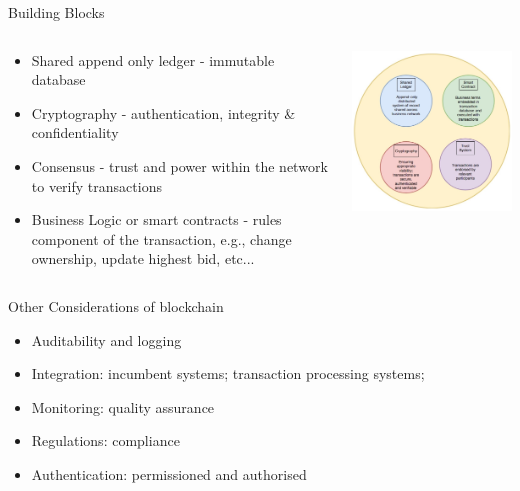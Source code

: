 \documentclass[pdf,table]{beamer}
\begin{document}
\begin{frame}{Building Blocks}
	\begin{columns}[T]
		\begin{column}{0.45\textwidth}
			\begin{itemize}
				\item Shared append only ledger - immutable database
				\item Cryptography - authentication, integrity \& confidentiality
				\item Consensus - trust and power within the network to verify transactions
				\item Business Logic or smart contracts - rules component of the transaction, e.g., change ownership, update highest bid, etc...
			\end{itemize}
		\end{column}
		\begin{column}{0.50\textwidth}
			\includegraphics[scale=0.45]{buildingBlocks}
		\end{column}
	\end{columns}	
\end{frame}

\begin{frame}{Other Considerations of blockchain}
	\begin{itemize}
		\item Auditability and logging
		\item Integration: incumbent systems; transaction processing systems; 
		\item Monitoring: quality assurance
		\item Regulations: compliance
		\item Authentication: permissioned and authorised
	\end{itemize}
\end{frame}
\end{document}
